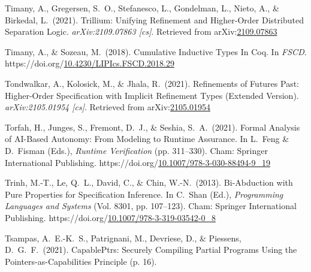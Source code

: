\documentclass[12pt,twoside]{article}
\begin{document}
{\begin{thebibliography}{1079}
\mdbibitemlabel{}Timany, A., Gregersen, S.~O., Stefanesco, L., Gondelman, L., Nieto, A., \& Birkedal, L.~(2021). Trillium: Unifying Refinement and Higher-Order Distributed Separation Logic. \emph{arXiv:2109.07863 {}[cs]}. Retrieved from arXiv:\href{http://arxiv.org/abs/2109.07863}{2109.07863}%

\mdbibitemlabel{}Timany, A., \& Sozeau, M.~(2018). Cumulative Inductive Types In Coq. In \emph{FSCD}. https://doi.org/\href{https://dx.doi.org/10.4230/LIPIcs.FSCD.2018.29}{10.4230/LIPIcs.FSCD.2018.29}%

\mdbibitemlabel{}Tondwalkar, A., Kolosick, M., \& Jhala, R.~(2021). Refinements of Futures Past: Higher-Order Specification with Implicit Refinement Types (Extended Version). \emph{arXiv:2105.01954 {}[cs]}. Retrieved from arXiv:\href{http://arxiv.org/abs/2105.01954}{2105.01954}%

\mdbibitemlabel{}Torfah, H., Junges, S., Fremont, D.~J., \& Seshia, S.~A.~(2021). Formal Analysis of AI-Based Autonomy: From Modeling to Runtime Assurance. In L.~Feng \& D.~Fisman (Eds.), \emph{Runtime Verification} (pp. 311–330). Cham: Springer International Publishing. https://doi.org/\href{https://dx.doi.org/10.1007/978-3-030-88494-9_19}{10.1007/978-3-030-88494-9\_19}%

\mdbibitemlabel{}Trinh, M.-T., Le, Q.~L., David, C., \& Chin, W.-N.~(2013). Bi-Abduction with Pure Properties for Specification Inference. In C.~Shan (Ed.), \emph{Programming Languages and Systems} (Vol. 8301, pp. 107–123). Cham: Springer International Publishing. https://doi.org/\href{https://dx.doi.org/10.1007/978-3-319-03542-0_8}{10.1007/978-3-319-03542-0\_8}%

\mdbibitemlabel{}Tsampas, A.~E.-K.~S., Patrignani, M., Devriese, D., \& Piessens, D.~G.~F.~(2021). CapablePtrs: Securely Compiling Partial Programs Using the Pointers-as-Capabilities Principle (p. 16).%


\end{thebibliography}}
\end{document}
